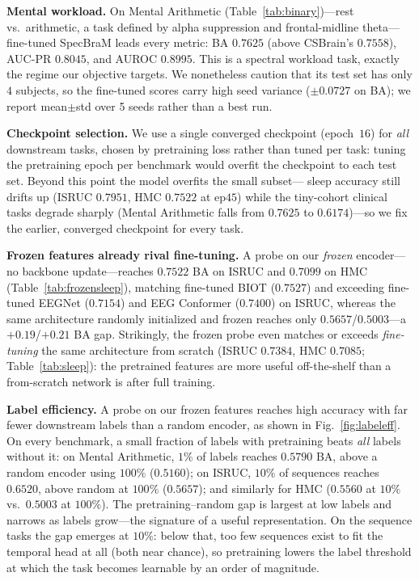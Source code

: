 \documentclass[letterpaper]{article} %
\begin{document}
\noindent\textbf{Mental workload.} On Mental Arithmetic
(Table~\ref{tab:binary})---rest vs.\ arithmetic, a task defined by alpha suppression
and frontal-midline theta---fine-tuned SpecBraM leads every metric: BA $0.7625$
(above CSBrain's $0.7558$), AUC-PR $0.8045$, and AUROC $0.8995$. This is a spectral
workload task, exactly the regime our objective targets. We nonetheless caution
that its test set has only $4$ subjects, so the fine-tuned scores carry high seed
variance (${\pm}0.0727$ on BA); we report mean${\pm}$std over 5 seeds rather than a
best run.

\noindent\textbf{Checkpoint selection.} We use a single converged checkpoint
(epoch~$16$) for \emph{all} downstream tasks, chosen by pretraining loss rather than
tuned per task: tuning the pretraining epoch per benchmark would overfit the
checkpoint to each test set. Beyond this point the model overfits the small subset---
sleep accuracy still drifts up (ISRUC $0.7951$, HMC $0.7522$ at ep$45$) while the
tiny-cohort clinical tasks degrade sharply (Mental Arithmetic falls from $0.7625$ to
$0.6174$)---so we fix the earlier, converged checkpoint for every task.

\noindent\textbf{Frozen features already rival fine-tuning.} A probe on our
\emph{frozen} encoder---no backbone update---reaches $0.7522$ BA on ISRUC and
$0.7099$ on HMC (Table~\ref{tab:frozensleep}), matching fine-tuned BIOT
($0.7527$) and exceeding fine-tuned EEGNet ($0.7154$) and EEG Conformer
($0.7400$) on ISRUC, whereas the same architecture randomly initialized and frozen
reaches only $0.5657$/$0.5003$---a ${+}0.19$/${+}0.21$ BA gap. Strikingly, the
frozen probe even matches or exceeds \emph{fine-tuning} the same architecture from
scratch (ISRUC $0.7384$, HMC $0.7085$; Table~\ref{tab:sleep}): the pretrained
features are more useful off-the-shelf than a from-scratch network is after full
training.

\noindent\textbf{Label efficiency.} A probe on our frozen features reaches high
accuracy with far fewer downstream labels than a random encoder, as shown in
Fig.~\ref{fig:labeleff}. On every benchmark, a small fraction of labels with
pretraining beats \emph{all} labels without it: on Mental Arithmetic, $1\%$ of
labels reaches $0.5790$ BA, above a random encoder using $100\%$ ($0.5160$); on
ISRUC, $10\%$ of sequences reaches $0.6520$, above random at $100\%$ ($0.5657$); and
similarly for HMC ($0.5560$ at $10\%$ vs.\ $0.5003$ at $100\%$). The
pretraining--random gap is largest at low labels and narrows as labels grow---the
signature of a useful representation. On the sequence tasks the gap emerges at
$10\%$: below that, too few sequences exist to fit the temporal head at all (both
near chance), so pretraining lowers the label threshold at which the task becomes
learnable by an order of magnitude.
\end{document}
